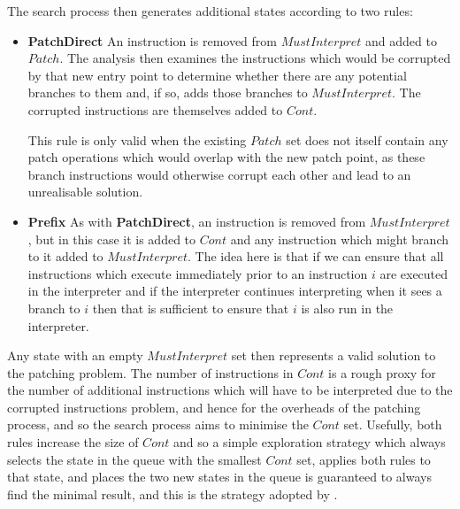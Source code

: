 The search process then generates additional states according to two
rules:

\begin{itemize}
\item
  \textbf{PatchDirect} An instruction is removed from
  $\mathit{MustInterpret}$ and added to $\mathit{Patch}$.  The
  analysis then examines the instructions which would be corrupted by
  that new entry point to determine whether there are any potential
  branches to them and, if so, adds those branches to
  $\mathit{MustInterpret}$.  The corrupted instructions are themselves
  added to $\mathit{Cont}$.

  This rule is only valid when the existing $\mathit{Patch}$ set does
  not itself contain any patch operations which would overlap with the
  new patch point, as these branch instructions would otherwise
  corrupt each other and lead to an unrealisable solution.
\item
  \textbf{Prefix} As with \textbf{PatchDirect}, an instruction is
  removed from $\mathit{MustInterpret}$, but in this case it is added
  to $\mathit{Cont}$ and any instruction which might branch to it
  added to $\mathit{MustInterpret}$.  The idea here is that if we can
  ensure that all instructions which execute immediately prior to an
  instruction $i$ are executed in the interpreter and if the
  interpreter continues interpreting when it sees a branch to $i$ then
  that is sufficient to ensure that $i$ is also run in the
  interpreter.
\end{itemize}

Any state with an empty $\mathit{MustInterpret}$ set then represents a
valid solution to the patching problem.  The number of instructions in
$\mathit{Cont}$ is a rough proxy for the number of additional
instructions which will have to be interpreted due to the corrupted
instructions problem, and hence for the overheads of the patching
process, and so the search process aims to minimise the
$\mathit{Cont}$ set.  Usefully, both rules increase the size of
$\mathit{Cont}$ and so a simple exploration strategy which always
selects the state in the queue with the smallest $\mathit{Cont}$ set,
applies both rules to that state, and places the two new states in the
queue is guaranteed to always find the minimal result, and this is the
strategy adopted by {\implementation}.

